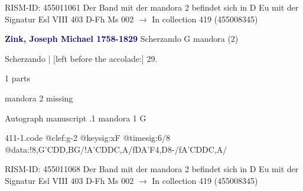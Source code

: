 \documentclass[twocolumn]{book}
\begin{document}
\newline RISM-ID: 455011061
\newline Der Band mit der mandora 2 befindet sich in D Eu mit der Signatur Esl VIII 403
\newline D-Fh  Ms 002
\newline $\rightarrow$ In collection 419 (455008345)

\newline \par \vspace{7pt} \textcolor{darkblue}{\textbf{Zink, Joseph Michael  1758-1829}}
\newline Scherzando  G  
\newline mandora (2)
\newline \begin{itshape}[f.17v, at left:] Scherzando | [left before the accolade:] 29.\end{itshape} 
\newline \textcolor{darkblue}{}  1 parts  
\newline \begin{small} mandora 2 missing\end{small} 
\newline Autograph manuscript
.1  mandora 1  G  
\begin{filecontents*}{411-1.code}
@clef:g-2
@keysig:xF
@timesig:6/8
@data:!8,G'CD{D,B}G/!A'CDDC,A/fDA'F4,D8-/fA'CDDC,A/
\end{filecontents*}
\newline
%

\newline RISM-ID: 455011068
\newline Der Band mit der mandora 2 befindet sich in D Eu mit der Signatur Esl VIII 403
\newline D-Fh  Ms 002
\newline $\rightarrow$ In collection 419 (455008345)
\end{document}
